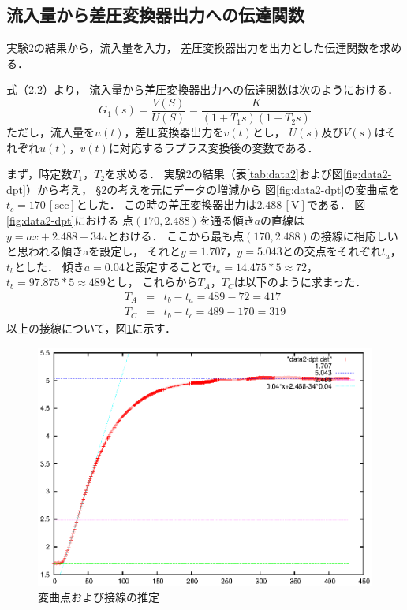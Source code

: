 \documentclass[11pt,a4paper]{jsarticle}
\begin{document}
\subsection{流入量から差圧変換器出力への伝達関数}

実験2の結果から，流入量を入力，
差圧変換器出力を出力とした伝達関数を求める．

式（2.2）より，
流入量から差圧変換器出力への伝達関数は次のようにおける．
\begin{equation}
  G_1(s) = \frac{V(S)}{U(S)} = \frac{K}{(1 + T_1 s)(1 + T_2 s)}
\end{equation}
ただし，流入量を$u(t)$，差圧変換器出力を$v(t)$とし，
$U(s)$及び$V(s)$はそれぞれ$u(t)$，$v(t)$に対応するラプラス変換後の変数である．

まず，時定数$T_1$，$T_2$を求める．
実験2の結果（表\ref{tab:data2}および図\ref{fig:data2-dpt}）から考え，
\S2の考えを元にデータの増減から
図\ref{fig:data2-dpt}の変曲点を$t_c = 170\,\mathrm{[sec]}$とした．
この時の差圧変換器出力は$2.488 \,\mathrm{[V]}$である．
図\ref{fig:data2-dpt}における
点$(170,2.488)$を通る傾き$a$の直線は$y = a x + 2.488 -34a$とおける．
ここから最も点$(170,2.488)$の接線に相応しいと思われる傾きaを設定し，
それと$y = 1.707$，$y = 5.043$との交点をそれぞれ$t_a$，$t_b$とした．
傾き$a = 0.04$と設定することで$t_a = 14.475 * 5 \approx 72$，
$t_b = 97.875 * 5 \approx 489$とし，
これらから$T_A$，$T_C$は以下のように求まった．
\begin{eqnarray}
  T_A &=& t_b - t_a = 489 - 72 = 417 \\
  T_C &=& t_b - t_c = 489 - 170 = 319
\end{eqnarray}
以上の接線について，図\ref{fig:line}に示す．

\begin{figure}[b]
  \begin{center}
    \includegraphics[width=0.9\hsize]{./data/data_line.eps}
  \end{center}
  \caption{変曲点および接線の推定}
  \label{fig:line}
\end{figure}
\end{document}
